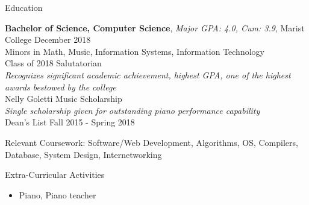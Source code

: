 \documentclass{edit} %
\begin{document}

\begin{rSection}{Education}

{\bf Bachelor of Science, Computer Science}, {\textit{Major GPA: 4.0, Cum: 3.9}}, Marist College \hfill {December 2018}\\
\small Minors in Math, Music, Information Systems, Information Technology \smallskip \\
Class of 2018 Salutatorian\\
\textit{Recognizes significant academic achievement, highest GPA, one of the highest awards bestowed by the college} \vspace{1mm}\\
Nelly Goletti Music Scholarship\\
\textit{Single scholarship given for outstanding piano performance capability} \vspace{1mm}\\
Dean's List Fall 2015 - Spring 2018

\small Relevant Coursework: Software/Web Development, Algorithms, OS, Compilers, Database, System Design, Internetworking

\end{rSection}

\begin{rSection}{Extra-Curricular Activities}
\begin{itemize}
    \itemsep -3pt {}
    \item 	Piano, Piano teacher
\end{itemize}

\end{rSection}
\end{document}
